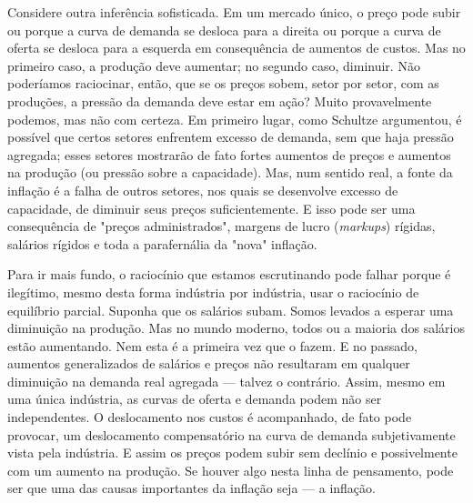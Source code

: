 \documentclass[12pt]{article}
\begin{document}
Considere outra inferência sofisticada. Em um mercado único, o preço pode subir ou porque a curva de demanda se desloca para a direita ou porque a curva de oferta se desloca para a esquerda em consequência de aumentos de custos. Mas no primeiro caso, a produção deve aumentar; no segundo caso, diminuir. Não poderíamos raciocinar, então, que se os preços sobem, setor por setor, com as produções, a pressão da demanda deve estar em ação? Muito provavelmente podemos, mas não com certeza. Em primeiro lugar, como Schultze argumentou, é possível que certos setores enfrentem excesso de demanda, sem que haja pressão agregada; esses setores mostrarão de fato fortes aumentos de preços e aumentos na produção (ou pressão sobre a capacidade). Mas, num sentido real, a fonte da inflação é a falha de outros setores, nos quais se desenvolve excesso de capacidade, de diminuir seus preços suficientemente. E isso pode ser uma consequência de "preços administrados", margens de lucro (\textit{markups}) rígidas, salários rígidos e toda a parafernália da "nova" inflação.

Para ir mais fundo, o raciocínio que estamos escrutinando pode falhar porque é ilegítimo, mesmo desta forma indústria por indústria, usar o raciocínio de equilíbrio parcial. Suponha que os salários subam. Somos levados a esperar uma diminuição na produção. Mas no mundo moderno, todos ou a maioria dos salários estão aumentando. Nem esta é a primeira vez que o fazem. E no passado, aumentos generalizados de salários e preços não resultaram em qualquer diminuição na demanda real agregada — talvez o contrário. Assim, mesmo em uma única indústria, as curvas de oferta e demanda podem não ser independentes. O deslocamento nos custos é acompanhado, de fato pode provocar, um deslocamento compensatório na curva de demanda subjetivamente vista pela indústria. E assim os preços podem subir sem declínio e possivelmente com um aumento na produção. Se houver algo nesta linha de pensamento, pode ser que uma das causas importantes da inflação seja — a inflação.
\end{document}
